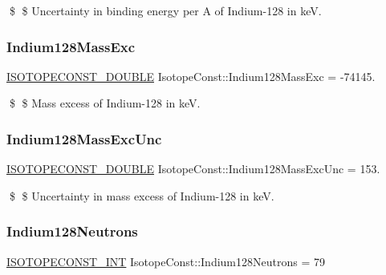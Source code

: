 \$ \$ Uncertainty in binding energy per A of Indium-\/128 in keV. \mbox{\label{group___isotope_const-_indium-_in128_gaa7e4ae72231b87d912077b84f55137fe}} 
\subsubsection{\texorpdfstring{Indium128\+Mass\+Exc}{Indium128MassExc}}
{\footnotesize\ttfamily \mbox{\hyperlink{group___isotope_const-_macros_ga8f45a7272ce02c0b4c65c44636ed719a}{I\+S\+O\+T\+O\+P\+E\+C\+O\+N\+S\+T\+\_\+\+D\+O\+U\+B\+LE}} Isotope\+Const\+::\+Indium128\+Mass\+Exc = -\/74145.}

\$ \$ Mass excess of Indium-\/128 in keV. \mbox{\label{group___isotope_const-_indium-_in128_gac243aeaf22796e49c28d19ea9b04fc0d}} 
\subsubsection{\texorpdfstring{Indium128\+Mass\+Exc\+Unc}{Indium128MassExcUnc}}
{\footnotesize\ttfamily \mbox{\hyperlink{group___isotope_const-_macros_ga8f45a7272ce02c0b4c65c44636ed719a}{I\+S\+O\+T\+O\+P\+E\+C\+O\+N\+S\+T\+\_\+\+D\+O\+U\+B\+LE}} Isotope\+Const\+::\+Indium128\+Mass\+Exc\+Unc = 153.}

\$ \$ Uncertainty in mass excess of Indium-\/128 in keV. \mbox{\label{group___isotope_const-_indium-_in128_gab10b8530797430ca64f8512879e509e9}} 
\subsubsection{\texorpdfstring{Indium128\+Neutrons}{Indium128Neutrons}}
{\footnotesize\ttfamily \mbox{\hyperlink{group___isotope_const-_macros_ga5f18360b3e99483a35c32d789e62621c}{I\+S\+O\+T\+O\+P\+E\+C\+O\+N\+S\+T\+\_\+\+I\+NT}} Isotope\+Const\+::\+Indium128\+Neutrons = 79}

